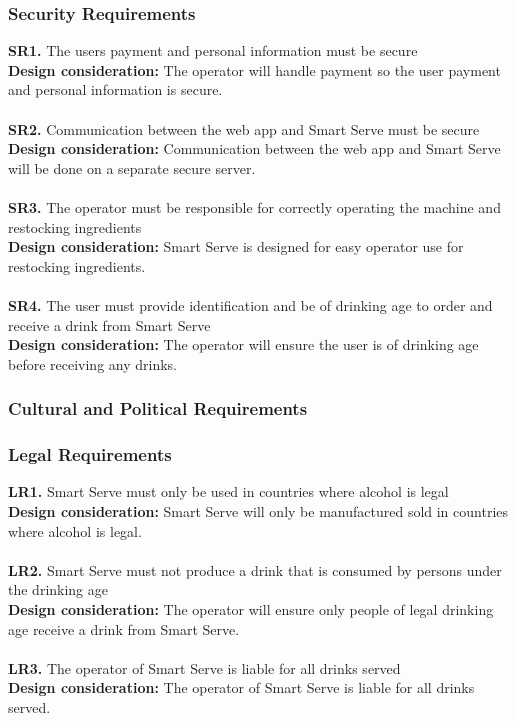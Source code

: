 \documentclass[12pt, titlepage]{article}
\begin{document}
\subsubsection{Security Requirements}
    \noindent\textbf{SR1.} The users payment and personal information must be secure \\
    \indent\textbf{Design consideration:} The operator will handle payment so the user payment and personal information is secure.\\\\
    \textbf{SR2.} Communication between the web app and Smart Serve must be secure \\
    \indent\textbf{Design consideration:} Communication between the web app and Smart Serve will be done on a separate secure server.\\\\
    \textbf{SR3.} The operator must be responsible for correctly operating the machine and restocking ingredients \\
    \indent\textbf{Design consideration:} Smart Serve is designed for easy operator use for restocking ingredients.\\\\
    \textbf{SR4.} The user must provide identification and be of drinking age to order and receive a drink from Smart Serve \\
    \indent\textbf{Design consideration:} The operator will ensure the user is of drinking age before receiving any drinks.

\subsubsection{Cultural and Political Requirements}
\subsubsection{Legal Requirements}
    \noindent\textbf{LR1.} Smart Serve must only be used in countries where alcohol is legal \\
    \indent\textbf{Design consideration:} Smart Serve will only be manufactured sold in countries where alcohol is legal.\\\\
    \textbf{LR2.} Smart Serve must not produce a drink that is consumed by persons under the drinking age \\
    \indent\textbf{Design consideration:} The operator will ensure only people of legal drinking age receive a drink from Smart Serve.\\\\
    \textbf{LR3.} The operator of Smart Serve is liable for all drinks served \\
    \indent\textbf{Design consideration:} The operator of Smart Serve is liable for all drinks served.
\end{document}
